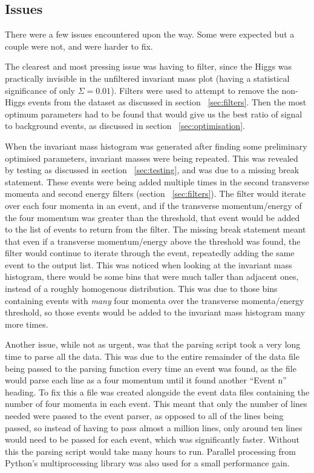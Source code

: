 \documentclass[11pt]{amsart}
\begin{document}
\begin{multicols}{2}
\section{Issues}
\label{sec:issues}

There were a few issues encountered upon the way. Some were expected but a couple were not, and were harder to fix.

The clearest and most pressing issue was having to filter, since the Higgs was practically invisible in the unfiltered invariant mass plot (having a statistical significance of only $\Sigma = 0.01$). Filters were used to attempt to remove the non-Higgs events from the dataset as discussed in section ~\ref{sec:filters}. Then the most optimum parameters had to be found that would give us the best ratio of signal to background events, as discussed in section ~\ref{sec:optimisation}.

When the invariant mass histogram was generated after finding some preliminary optimised parameters, invariant masses were being repeated. This was revealed by testing as discussed in section ~\ref{sec:testing}, and was due to a missing break statement. These events were being added multiple times in the second transverse momenta and second energy filters (section ~\ref{sec:filters}). The filter would iterate over each four momenta in an event, and if the transverse momentum/energy of the four momentum was greater than the threshold, that event would be added to the list of events to return from the filter. The missing break statement meant that even if a transverse momentum/energy above the threshold was found, the filter would continue to iterate through the event, repeatedly adding the same event to the output list. This was noticed when looking at the invariant mass histogram, there would be some bins that were much taller than adjacent ones, instead of a roughly homogenous distribution. This was due to those bins containing events with \textit{many} four momenta over the transverse momenta/energy threshold, so those events would be added to the invariant mass histogram many more times.

Another issue, while not as urgent, was that the parsing script took a very long time to parse all the data. This was due to the entire remainder of the data file being passed to the parsing function every time an event was found, as the file would parse each line as a four momentum until it found another ``Event n'' heading. To fix this a file was created alongside the event data files containing the number of four momenta in each event. This meant that only the number of lines needed were passed to the event parser, as opposed to all of the lines being passed, so instead of having to pass almost a million lines, only around ten lines would need to be passed for each event, which was significantly faster. Without this the parsing script would take many hours to run. Parallel processing from Python's multiprocessing library was also used for a small performance gain.


\end{multicols}
\end{document}
